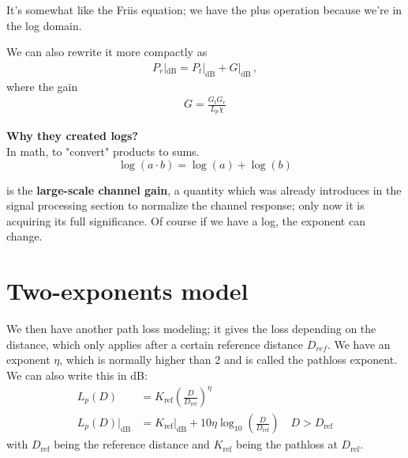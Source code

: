\documentclass[a4paper, 12pt]{book}
\begin{document}
It's somewhat like the Friis equation; we have the plus operation because we're in the log domain.

\begin{minipage}{0.65\textwidth}
We can also rewrite it \colorbox{yellow!30}{more compactly as}
\begin{align}
P_r|_{\text{dB}} = P_t|_{\text{dB}} + G|_{\text{dB}} \,, \tag{3.5}
\end{align}
where \colorbox{yellow!30}{the gain}
\begin{align}
G = \frac{G_t G_r}{L_p \chi} \tag{3.6}
\end{align}
\end{minipage}
\hfill
\begin{minipage}{0.3\textwidth}
    \footnotesize
    \textbf{Why they created logs?} \\
    In math, to "convert" products to sums.
    \[ \log(a \cdot b) = \log(a) + \log(b) \]
\end{minipage}

\vspace{1em}
is the \textbf{large-scale channel gain}, a quantity which was already introduces in the signal processing section to normalize the channel response; only now it is acquiring its full significance.
Of course if we have a log, the exponent can change.

\section{Two-exponents model}

\colorbox{yellow!30}{We then have} another \colorbox{yellow!30}{path loss modeling}; it gives the loss depending on the distance, which only applies after a certain reference distance $D_{ref}$. We have an exponent $\eta$, which is normally higher than 2 and is called the pathloss exponent. We can also write this in dB:
\begin{align}
L_p(D) &= K_{\text{ref}} \left( \frac{D}{D_{\text{ref}}} \right)^\eta \tag{3.7} \\
L_p(D)|_{\text{dB}} &= K_{\text{ref}}|_{\text{dB}} + 10\eta \log_{10} \left( \frac{D}{D_{\text{ref}}} \right) \quad D > D_{\text{ref}} \tag{3.8}
\end{align}
with $D_{\text{ref}}$ being the reference distance and $K_{\text{ref}}$ being the pathloss at $D_{\text{ref}}$.
\end{document}

